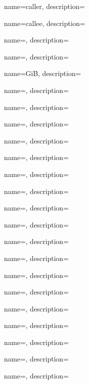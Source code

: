 {
  name=caller,
  description={\ITph{}}
}

{
  name=callee,
  description={\ITph{}}
}

{
  name={\ITph{}},
  description={\ITph{}}
}

{
  name={\ITph{}},
  description={\ITph{}}
}

{
  name={GiB},
  description={\ITph{}}
}

{
  name={\ITph},
  description={\ITph{}}
}

{
  name={\ITph},
  description={\ITph{}}
}

{
  name={\ITph},
  description={\ITph{}}
}

{
  name={\ITph},
  description={\ITph{}}
}

{
  name={\ITph},
  description={\ITph{}}
}

{
  name={\ITph},
  description={\ITph{}}
}

{
  name={\ITph},
  description={\ITph{}}
}

{
  name={\ITph},
  description={\ITph{}}
}

{
  name={\ITph},
  description={\ITph{}}
}

{
  name={\ITph},
  description={\ITph{}}
}

{
  name={\ITph},
  description={\ITph{}}
}

{
  name={\ITph},
  description={\ITph{}}
}

{
  name={\ITph},
  description={\ITph{}}
}

{
  name={\ITph},
  description={\ITph{}}
}

{
  name={\ITph},
  description={\ITph{}}
}

{
  name={\ITph},
  description={\ITph{}}
}

{
  name={\ITph},
  description={\ITph{}}
}

{
  name={\ITph},
  description={\ITph{}}
}

